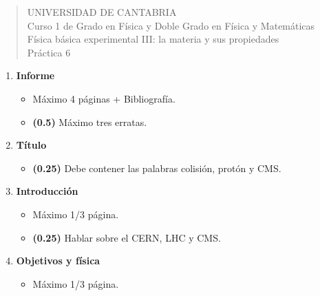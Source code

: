 \documentclass[11pt]{articulo}
\begin{document}
\begin{verse}
{\Large UNIVERSIDAD DE CANTABRIA}\\ 
\vspace*{0.5cm}
{\normalsize \rm Curso 1 de Grado en F\'isica y Doble Grado en F\'isica y Matem\'aticas}\\
{\normalsize \rm F\'isica b\'asica experimental III: la materia y sus propiedades}\\ 
{\normalsize \rm Pr\'actica 6}\\
\end{verse} 

\vspace*{0.25cm}

\begin{enumerate}

\item {\bf Informe}

\begin{itemize}

\item M\'aximo 4 p\'aginas + Bibliograf\'ia.

\item {\bf (0.5)} M\'aximo tres erratas.

\end{itemize}

\item {\bf T\'itulo}

\begin{itemize}

\item {\bf (0.25)} Debe contener las palabras colisi\'on, prot\'on y CMS.

\end{itemize}

\item {\bf Introducci\'on}

\begin{itemize}

\item M\'aximo 1/3 p\'agina.

\item {\bf (0.25)} Hablar sobre el CERN, LHC y CMS.

\end{itemize}

\item {\bf Objetivos y f\'isica}

\begin{itemize}

\item M\'aximo 1/3 p\'agina.


\end{itemize}
\end{enumerate}
\end{document}

